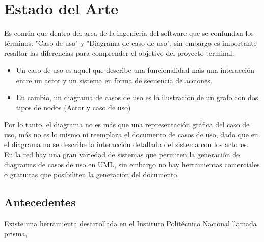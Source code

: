 \chapter{Estado del Arte}


	Es común que dentro del area de la ingenieria del software que se confundan los términos: "Caso de uso" y "Diagrama de caso de uso", sin embargo es importante resaltar las diferencias para comprender el objetivo del proyecto terminal.
	
	 \begin{itemize}
		\item Un caso de uso es aquel que describe una  funcionalidad más una interacción entre un actor y un sistema en forma de secuencia de acciones.
		
		\item En cambio, un diagrama de casos de uso es la ilustración de un grafo con dos tipos de nodos (Actor y caso de uso) 
	\end{itemize}

	Por lo tanto, el diagrama no es más que una representación gráfica del caso de uso, más no es lo mismo ni reemplaza el documento de casos de uso, dado que en el diagrama no se describe la interacción detallada del sistema con los actores.\\
	
	
	En la red hay una gran variedad de sistemas que permiten la generación de diagramas de casos de uso en UML, sin embargo no hay herramientas comerciales o gratuitas que posibiliten la generación del documento.
	


\section{Antecedentes}

	Existe una herramienta desarrollada en el Instituto Politécnico Nacional llamada prisma, 


